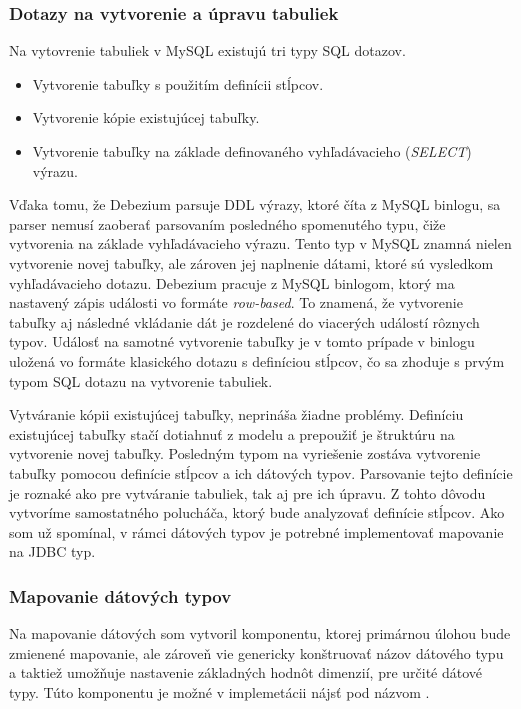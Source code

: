 \subsubsection{Dotazy na vytvorenie a úpravu tabuliek}\label{createAlterTable}
Na vytovrenie tabuliek v MySQL existujú tri typy SQL dotazov. 
\begin{itemize}
\item Vytvorenie tabuľky s použitím definícii stĺpcov.
\item Vytvorenie kópie existujúcej tabuľky.
\item Vytvorenie tabuľky na základe definovaného vyhľadávacieho (\textit{SELECT}) výrazu.
\end{itemize}

Vďaka tomu, že Debezium parsuje DDL výrazy, ktoré číta z MySQL binlogu, sa parser nemusí zaoberať parsovaním posledného spomenutého typu, čiže vytvorenia na základe vyhľadávacieho výrazu. Tento typ v MySQL znamná nielen vytvorenie novej tabuľky, ale zároven jej naplnenie dátami, ktoré sú vysledkom vyhľadávacieho dotazu. Debezium pracuje z MySQL binlogom, ktorý ma nastavený zápis události vo formáte \textit{row-based}. To znamená, že vytvorenie tabuľky aj následné vkládanie dát je rozdelené do viacerých událostí rôznych typov. Událosť na samotné vytvorenie tabuľky je v tomto prípade v binlogu uložená vo formáte klasického dotazu s definíciou stĺpcov, čo sa zhoduje s prvým typom SQL dotazu na vytvorenie tabuliek.

Vytváranie kópii existujúcej tabuľky, neprináša žiadne problémy. Definíciu existujúcej tabuľky stačí dotiahnuť z modelu a prepoužiť je štruktúru na vytvorenie novej tabuľky. Posledným typom na vyriešenie zostáva vytvorenie tabuľky pomocou definície stĺpcov a ich dátových typov. Parsovanie tejto definície je roznaké ako pre vytváranie tabuliek, tak aj pre ich úpravu. Z tohto dôvodu vytvoríme samostatného polucháča, ktorý bude analyzovať definície stĺpcov. Ako som už spomínal, v rámci dátových typov je potrebné implementovať mapovanie na JDBC typ.

\subsubsection{Mapovanie dátových typov}
Na mapovanie dátových som vytvoril komponentu, ktorej primárnou úlohou bude zmienené mapovanie, ale zároveň vie genericky konštruovať názov dátového typu a taktiež umožňuje nastavenie základných hodnôt dimenzií, pre určité dátové typy. Túto komponentu je možné v implemetácii nájsť pod názvom .

